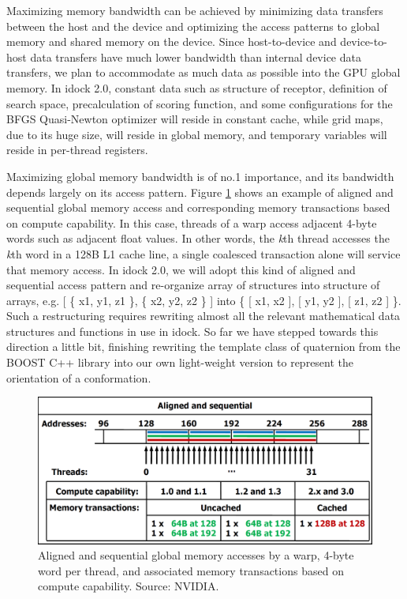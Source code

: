 Maximizing memory bandwidth can be achieved by minimizing data transfers between the host and the device and optimizing the access patterns to global memory and shared memory on the device. Since host-to-device and device-to-host data transfers have much lower bandwidth than internal device data transfers, we plan to accommodate as much data as possible into the GPU global memory. In idock 2.0, constant data such as structure of receptor, definition of search space, precalculation of scoring function, and some configurations for the BFGS Quasi-Newton optimizer will reside in constant cache, while grid maps, due to its huge size, will reside in global memory, and temporary variables will reside in per-thread registers.

Maximizing global memory bandwidth is of no.1 importance, and its bandwidth depends largely on its access pattern. Figure \ref{GPU:AlignedSequentialGlobalMemoryAccess} shows an example of aligned and sequential global memory access and corresponding memory transactions based on compute capability. In this case, threads of a warp access adjacent 4-byte words such as adjacent float values. In other words, the \textit{k}th thread accesses the \textit{k}th word in a 128B L1 cache line, a single coalesced transaction alone will service that memory access. In idock 2.0, we will adopt this kind of aligned and sequential access pattern and re-organize array of structures into structure of arrays, e.g.  [ \{ x1, y1, z1 \}, \{ x2, y2, z2 \} ] into \{ [ x1, x2 ], [ y1, y2 ], [ z1, z2 ] \}. Such a restructuring requires rewriting almost all the relevant mathematical data structures and functions in use in idock. So far we have stepped towards this direction a little bit, finishing rewriting the template class of quaternion from the BOOST C++ library into our own light-weight version to represent the orientation of a conformation.

\begin{figure}
\centering
\includegraphics[width=\linewidth]{GPU/AlignedSequentialGlobalMemoryAccess.png}
\caption{Aligned and sequential global memory accesses by a warp, 4-byte word per thread, and associated memory transactions based on compute capability. Source: NVIDIA.}
\label{GPU:AlignedSequentialGlobalMemoryAccess}
\end{figure}

